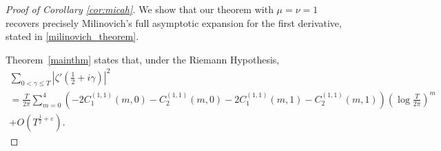 \documentclass[12pt, a4paper,reqno]{amsart}
\theoremstyle{definition}
\numberwithin{equation}{section}
\begin{document}
\begin{proof}[Proof of Corollary \ref{cor:micah}]

We show that our theorem with $\mu=\nu=1$ recovers precisely Milinovich's full asymptotic expansion for the first derivative, stated in \eqref{milinovich_theorem}.

Theorem~\ref{mainthm} states that, under the Riemann Hypothesis,
\begin{multline*}
\sum_{0<\gamma\le T}\left|\zeta'\left(\frac{1}{2}+i\gamma\right)\right|^2 \\
= \frac{T}{2\pi} \sum_{m=0}^4 (-2C_1^{(1,1)}(m,0) -C_2^{(1,1)}(m,0) -  2C_1^{(1,1)}(m,1) - C_2^{(1,1)}(m,1)) \left(\log\frac{T}{2\pi}\right)^m \\
+ O\left(T^{\frac{1}{2}+\varepsilon}\right).
\end{multline*}


\end{proof}
\end{document}
